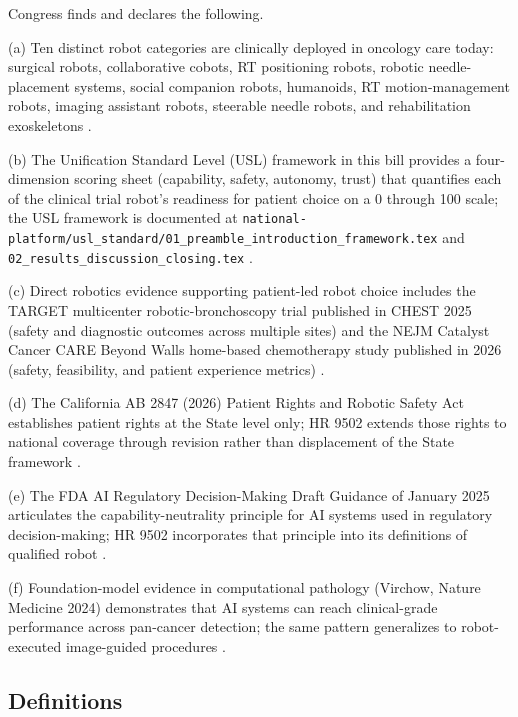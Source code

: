 \hspace{0.5cm} Congress finds and declares the following.

(a) Ten distinct robot categories are clinically deployed in
oncology care today: surgical robots, collaborative cobots, RT
positioning robots, robotic needle-placement systems, social
companion robots, humanoids, RT motion-management robots, imaging
assistant robots, steerable needle robots, and rehabilitation
exoskeletons \cite{kawchak_2026_18810541}.

(b) The Unification Standard Level (USL) framework in this bill provides a
four-dimension scoring sheet (capability, safety, autonomy, trust)
that quantifies each of the clinical trial robot's readiness for patient choice on a 0
through 100 scale; the USL framework is documented at
\texttt{national-platform/usl\_standard/01\_preamble\_introduction\_framework.tex}
and \texttt{02\_results\_discussion\_closing.tex}
\cite{kawchak_2026_18778219}.

(c) Direct robotics evidence supporting patient-led robot choice
includes the TARGET multicenter robotic-bronchoscopy trial published
in CHEST 2025 (safety and diagnostic outcomes across multiple sites)
and the NEJM Catalyst Cancer CARE Beyond Walls home-based
chemotherapy study published in 2026 (safety, feasibility, and
patient experience metrics) \cite{target2025robotic_bronchoscopy,
dronca2026cancer_care_beyond_walls}.

(d) The California AB 2847 (2026) Patient Rights and Robotic Safety
Act establishes patient rights at the State level only; HR 9502
extends those rights to national coverage through revision rather
than displacement of the State framework \cite{kawchak_2026_19176370}.

(e) The FDA AI Regulatory Decision-Making Draft Guidance of January
2025 articulates the capability-neutrality principle for AI systems
used in regulatory decision-making; HR 9502 incorporates that
principle into its definitions of qualified robot
\cite{fda_ai_regulatory_decision_draft_2025}.

(f) Foundation-model evidence in computational pathology (Virchow,
Nature Medicine 2024) demonstrates that AI systems can reach clinical-grade performance across pan-cancer detection; the same pattern
generalizes to robot-executed image-guided procedures
\cite{vorontsov2024virchow}.

\subsection{Definitions}

